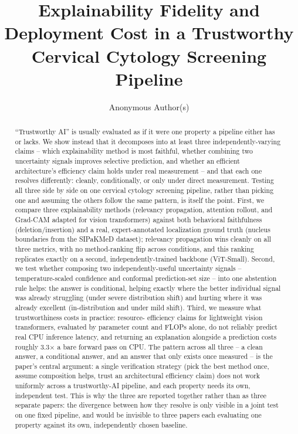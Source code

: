 \documentclass[runningheads]{llncs}
\begin{document}
\title{Explainability Fidelity and Deployment Cost in a Trustworthy Cervical Cytology Screening Pipeline}

\author{Anonymous Author(s)}

\maketitle

\begin{abstract}
``Trustworthy AI'' is usually evaluated as if it were one property a
pipeline either has or lacks. We show instead that it decomposes into at
least three independently-varying claims -- which explainability method
is most faithful, whether combining two uncertainty signals improves
selective prediction, and whether an efficient architecture's efficiency
claim holds under real measurement -- and that each one resolves
differently: cleanly, conditionally, or only under direct measurement.
Testing all three side by side on one cervical cytology screening
pipeline, rather than picking one and assuming the others follow the same
pattern, is itself the point. First, we compare three explainability
methods (relevancy propagation, attention rollout, and Grad-CAM adapted
for vision transformers) against both behavioral faithfulness
(deletion/insertion) and a real, expert-annotated localization ground
truth (nucleus boundaries from the SIPaKMeD dataset); relevancy
propagation wins cleanly on all three metrics, with no method-ranking
flip across conditions, and this ranking replicates exactly on a second,
independently-trained backbone (ViT-Small). Second, we test whether composing two
independently-useful uncertainty signals -- temperature-scaled confidence
and conformal prediction-set size -- into one abstention rule helps: the
answer is conditional, helping exactly where the better individual signal
was already struggling (under severe distribution shift) and hurting
where it was already excellent (in-distribution and under mild shift).
Third, we measure what trustworthiness costs in practice: resource-
efficiency claims for lightweight vision transformers, evaluated by
parameter count and FLOPs alone, do not reliably predict real CPU
inference latency, and returning an explanation alongside a prediction
costs roughly 3.3$\times$ a bare forward pass on CPU. The pattern across
all three -- a clean answer, a conditional answer, and an answer that
only exists once measured -- is the paper's central argument: a single
verification strategy (pick the best method once, assume composition
helps, trust an architectural efficiency claim) does not work uniformly
across a trustworthy-AI pipeline, and each property needs its own,
independent test. This is why the three are reported together rather
than as three separate papers: the divergence between how they resolve is
only visible in a joint test on one fixed pipeline, and would be invisible
to three papers each evaluating one property against its own,
independently chosen baseline.


\end{abstract}
\end{document}
